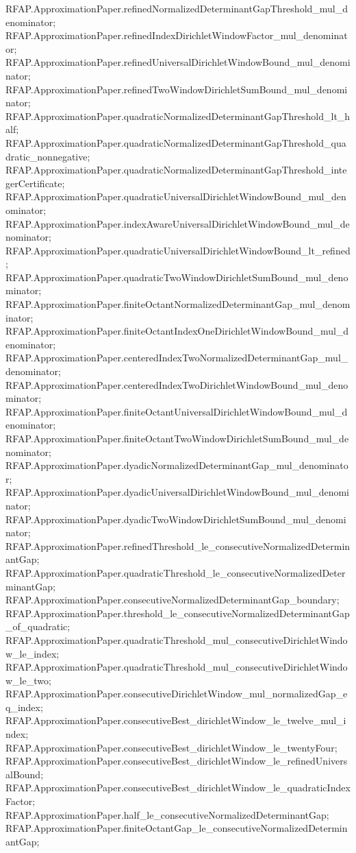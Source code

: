 \documentclass[11pt]{article}
\begin{document}
{RFAP.ApproximationPaper.refinedNormalizedDeterminantGapThreshold_mul_denominator;
RFAP.ApproximationPaper.refinedIndexDirichletWindowFactor_mul_denominator;
RFAP.ApproximationPaper.refinedUniversalDirichletWindowBound_mul_denominator;
RFAP.ApproximationPaper.refinedTwoWindowDirichletSumBound_mul_denominator;
RFAP.ApproximationPaper.quadraticNormalizedDeterminantGapThreshold_lt_half;
RFAP.ApproximationPaper.quadraticNormalizedDeterminantGapThreshold_quadratic_nonnegative;
RFAP.ApproximationPaper.quadraticNormalizedDeterminantGapThreshold_integerCertificate;
RFAP.ApproximationPaper.quadraticUniversalDirichletWindowBound_mul_denominator;
RFAP.ApproximationPaper.indexAwareUniversalDirichletWindowBound_mul_denominator;
RFAP.ApproximationPaper.quadraticUniversalDirichletWindowBound_lt_refined;
RFAP.ApproximationPaper.quadraticTwoWindowDirichletSumBound_mul_denominator;
RFAP.ApproximationPaper.finiteOctantNormalizedDeterminantGap_mul_denominator;
RFAP.ApproximationPaper.finiteOctantIndexOneDirichletWindowBound_mul_denominator;
RFAP.ApproximationPaper.centeredIndexTwoNormalizedDeterminantGap_mul_denominator;
RFAP.ApproximationPaper.centeredIndexTwoDirichletWindowBound_mul_denominator;
RFAP.ApproximationPaper.finiteOctantUniversalDirichletWindowBound_mul_denominator;
RFAP.ApproximationPaper.finiteOctantTwoWindowDirichletSumBound_mul_denominator;
RFAP.ApproximationPaper.dyadicNormalizedDeterminantGap_mul_denominator;
RFAP.ApproximationPaper.dyadicUniversalDirichletWindowBound_mul_denominator;
RFAP.ApproximationPaper.dyadicTwoWindowDirichletSumBound_mul_denominator;
RFAP.ApproximationPaper.refinedThreshold_le_consecutiveNormalizedDeterminantGap;
RFAP.ApproximationPaper.quadraticThreshold_le_consecutiveNormalizedDeterminantGap;
RFAP.ApproximationPaper.consecutiveNormalizedDeterminantGap_boundary;
RFAP.ApproximationPaper.threshold_le_consecutiveNormalizedDeterminantGap_of_quadratic;
RFAP.ApproximationPaper.quadraticThreshold_mul_consecutiveDirichletWindow_le_index;
RFAP.ApproximationPaper.quadraticThreshold_mul_consecutiveDirichletWindow_le_two;
RFAP.ApproximationPaper.consecutiveDirichletWindow_mul_normalizedGap_eq_index;
RFAP.ApproximationPaper.consecutiveBest_dirichletWindow_le_twelve_mul_index;
RFAP.ApproximationPaper.consecutiveBest_dirichletWindow_le_twentyFour;
RFAP.ApproximationPaper.consecutiveBest_dirichletWindow_le_refinedUniversalBound;
RFAP.ApproximationPaper.consecutiveBest_dirichletWindow_le_quadraticIndexFactor;
RFAP.ApproximationPaper.half_le_consecutiveNormalizedDeterminantGap;
RFAP.ApproximationPaper.finiteOctantGap_le_consecutiveNormalizedDeterminantGap;
}
\end{document}
